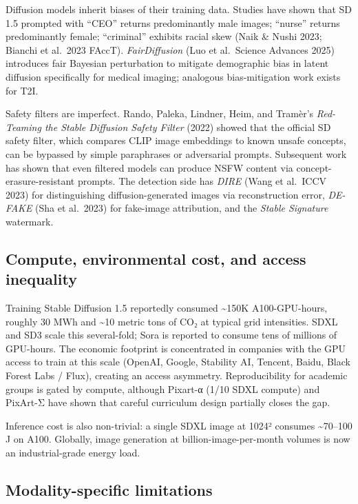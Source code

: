 Diffusion models inherit biases of their training data. Studies have shown that SD 1.5 prompted with ``CEO'' returns predominantly male images; ``nurse'' returns predominantly female; ``criminal'' exhibits racial skew (Naik \& Nushi 2023; Bianchi et al.~2023 FAccT). \emph{FairDiffusion} (Luo et al.~Science Advances 2025) introduces fair Bayesian perturbation to mitigate demographic bias in latent diffusion specifically for medical imaging; analogous bias-mitigation work exists for T2I.

Safety filters are imperfect. Rando, Paleka, Lindner, Heim, and Tramèr's \emph{Red-Teaming the Stable Diffusion Safety Filter} (2022) showed that the official SD safety filter, which compares CLIP image embeddings to known unsafe concepts, can be bypassed by simple paraphrases or adversarial prompts. Subsequent work has shown that even filtered models can produce NSFW content via concept-erasure-resistant prompts. The detection side has \emph{DIRE} (Wang et al.~ICCV 2023) for distinguishing diffusion-generated images via reconstruction error, \emph{DE-FAKE} (Sha et al.~2023) for fake-image attribution, and the \emph{Stable Signature} watermark.

\subsection{Compute, environmental cost, and access inequality}\label{compute-environmental-cost-and-access-inequality}

Training Stable Diffusion 1.5 reportedly consumed \textasciitilde150K A100-GPU-hours, roughly 30 MWh and \textasciitilde10 metric tons of CO₂ at typical grid intensities. SDXL and SD3 scale this several-fold; Sora is reported to consume tens of millions of GPU-hours. The economic footprint is concentrated in companies with the GPU access to train at this scale (OpenAI, Google, Stability AI, Tencent, Baidu, Black Forest Labs / Flux), creating an access asymmetry. Reproducibility for academic groups is gated by compute, although Pixart-α (1/10 SDXL compute) and PixArt-Σ have shown that careful curriculum design partially closes the gap.

Inference cost is also non-trivial: a single SDXL image at 1024² consumes \textasciitilde70--100 J on A100. Globally, image generation at billion-image-per-month volumes is now an industrial-grade energy load.

\subsection{Modality-specific limitations}\label{modality-specific-limitations}

